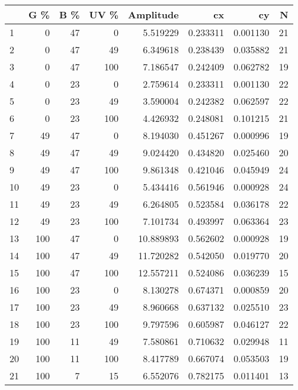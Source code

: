 \begin{tabular}{lrrrrrrr}
\toprule
{} &  G \% &  B \% &  UV \% &  Amplitude &        cx &        cy &   N \\
\midrule
1  &    0 &   47 &     0 &   5.519229 &  0.233311 &  0.001130 &  21 \\
2  &    0 &   47 &    49 &   6.349618 &  0.238439 &  0.035882 &  21 \\
3  &    0 &   47 &   100 &   7.186547 &  0.242409 &  0.062782 &  19 \\
4  &    0 &   23 &     0 &   2.759614 &  0.233311 &  0.001130 &  22 \\
5  &    0 &   23 &    49 &   3.590004 &  0.242382 &  0.062597 &  22 \\
6  &    0 &   23 &   100 &   4.426932 &  0.248081 &  0.101215 &  21 \\
7  &   49 &   47 &     0 &   8.194030 &  0.451267 &  0.000996 &  19 \\
8  &   49 &   47 &    49 &   9.024420 &  0.434820 &  0.025460 &  20 \\
9  &   49 &   47 &   100 &   9.861348 &  0.421046 &  0.045949 &  24 \\
10 &   49 &   23 &     0 &   5.434416 &  0.561946 &  0.000928 &  24 \\
11 &   49 &   23 &    49 &   6.264805 &  0.523584 &  0.036178 &  22 \\
12 &   49 &   23 &   100 &   7.101734 &  0.493997 &  0.063364 &  23 \\
13 &  100 &   47 &     0 &  10.889893 &  0.562602 &  0.000928 &  19 \\
14 &  100 &   47 &    49 &  11.720282 &  0.542050 &  0.019770 &  20 \\
15 &  100 &   47 &   100 &  12.557211 &  0.524086 &  0.036239 &  15 \\
16 &  100 &   23 &     0 &   8.130278 &  0.674371 &  0.000859 &  20 \\
17 &  100 &   23 &    49 &   8.960668 &  0.637132 &  0.025510 &  23 \\
18 &  100 &   23 &   100 &   9.797596 &  0.605987 &  0.046127 &  22 \\
19 &  100 &   11 &    49 &   7.580861 &  0.710632 &  0.029948 &  11 \\
20 &  100 &   11 &   100 &   8.417789 &  0.667074 &  0.053503 &  19 \\
21 &  100 &    7 &    15 &   6.552076 &  0.782175 &  0.011401 &  13 \\
\bottomrule
\end{tabular}
